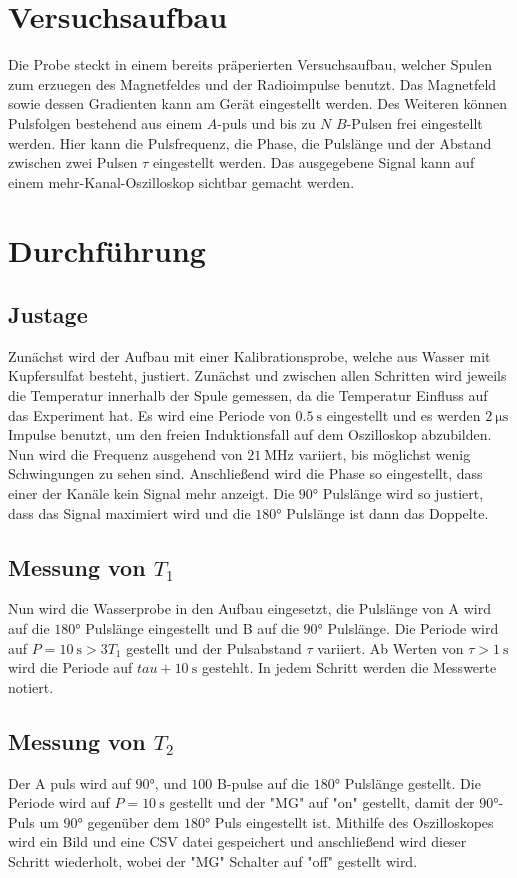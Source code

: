 \section{Versuchsaufbau}
Die Probe steckt in einem bereits präperierten Versuchsaufbau, welcher Spulen zum erzuegen des Magnetfeldes und der Radioimpulse benutzt.
Das Magnetfeld sowie dessen Gradienten kann am Gerät eingestellt werden. 
Des Weiteren können Pulsfolgen bestehend aus einem $A$-puls und bis zu $N$ $B$-Pulsen frei eingestellt werden.
Hier kann die Pulsfrequenz, die Phase, die Pulslänge und der Abstand zwischen zwei Pulsen $\tau$ eingestellt werden.
Das ausgegebene Signal kann auf einem mehr-Kanal-Oszilloskop sichtbar gemacht werden.
\section{Durchführung}
\subsection{Justage}
Zunächst wird der Aufbau mit einer Kalibrationsprobe, welche aus Wasser mit Kupfersulfat besteht, justiert.
Zunächst und zwischen allen Schritten wird jeweils die Temperatur innerhalb der Spule gemessen, da die Temperatur Einfluss auf das Experiment hat.
Es wird eine Periode von $\SI{0.5}{\second} $ eingestellt und es werden $\SI{2}{\micro\second}$ Impulse benutzt, um den freien Induktionsfall auf dem Oszilloskop abzubilden.
Nun wird die Frequenz ausgehend von $\SI{21}{\MHz}$ variiert, bis möglichst wenig Schwingungen zu sehen sind. Anschließend wird die Phase so eingestellt, dass einer der Kanäle kein Signal mehr anzeigt.
Die $90°$ Pulslänge wird so justiert, dass das Signal maximiert wird und die $180°$ Pulslänge ist dann das Doppelte.
\subsection{Messung von $T_1$}
Nun wird die Wasserprobe in den Aufbau eingesetzt, die Pulslänge von A wird auf die $180°$ Pulslänge eingestellt und B auf die $90°$ Pulslänge. Die Periode wird auf $ P = \SI{10}{\second} > 3 T_1$ gestellt und der Pulsabstand $\tau $ variiert. 
Ab Werten von $\tau >\SI{1}{\second}$ wird die Periode auf $tau + \SI{10}{\second}$ gestehlt. In jedem Schritt werden die Messwerte notiert.
\subsection{Messung von $T_2$}
Der A puls wird auf $90°$, und $100$ B-pulse auf die $180°$ Pulslänge gestellt.
Die Periode wird auf $P = \SI{10}{\second}$ gestellt und der "MG" auf "on" gestellt, damit der $90°$-Puls um $90°$ gegenüber dem $180°$ Puls eingestellt ist.
Mithilfe des Oszilloskopes wird ein Bild und eine CSV datei gespeichert und anschließend wird dieser Schritt wiederholt, wobei der "MG" Schalter auf "off" gestellt wird.
